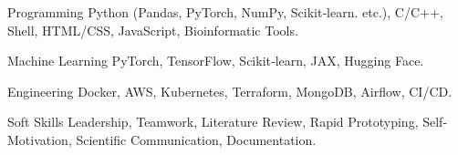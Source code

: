 

\begin{cvskills}

  \cvskill
    {Programming} %
    {Python (Pandas, PyTorch, NumPy, Scikit‑learn. etc.), C/C++, Shell, HTML/CSS, JavaScript, Bioinformatic Tools.} %

  \cvskill
    {Machine Learning} %
    {PyTorch, TensorFlow, Scikit‑learn, JAX, Hugging Face.} %

  \cvskill
    {Engineering} %
    {Docker, AWS, Kubernetes, Terraform, MongoDB, Airflow, CI/CD.} %

  \cvskill
    {Soft Skills} %
    {Leadership, Teamwork, Literature Review, Rapid Prototyping, Self-Motivation, Scientific Communication, Documentation.} %

\end{cvskills}
